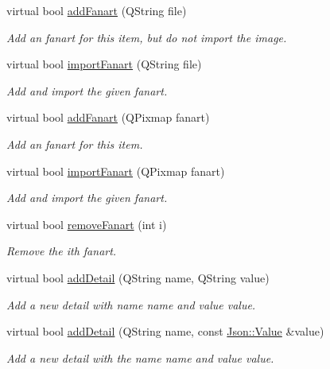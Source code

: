 \begin{DoxyCompactItemize}
virtual bool \hyperlink{class_a_w_e_1_1_media_item_a1a67e62362a38fcfafc0bb4178a9205a}{add\-Fanart} (Q\-String file)
\begin{DoxyCompactList}\small\item\em Add an fanart for this item, but do not import the image. \end{DoxyCompactList}\item 
virtual bool \hyperlink{class_a_w_e_1_1_media_item_a9156ae857b0ea582bce8166bccdee5f3}{import\-Fanart} (Q\-String file)
\begin{DoxyCompactList}\small\item\em Add and import the given fanart. \end{DoxyCompactList}\item 
virtual bool \hyperlink{class_a_w_e_1_1_media_item_af99834d4c4f625a5b8c6a7891f077c3b}{add\-Fanart} (Q\-Pixmap fanart)
\begin{DoxyCompactList}\small\item\em Add an fanart for this item. \end{DoxyCompactList}\item 
virtual bool \hyperlink{class_a_w_e_1_1_media_item_aa66bd862c10c5b003522855e1a5dad8c}{import\-Fanart} (Q\-Pixmap fanart)
\begin{DoxyCompactList}\small\item\em Add and import the given fanart. \end{DoxyCompactList}\item 
virtual bool \hyperlink{class_a_w_e_1_1_media_item_a3be42e522441f9b59d27383715381fb5}{remove\-Fanart} (int i)
\begin{DoxyCompactList}\small\item\em Remove the {\ttfamily i}th fanart. \end{DoxyCompactList}\item 
virtual bool \hyperlink{class_a_w_e_1_1_media_item_a64efa5df14b0d0342873fd497f2e764c}{add\-Detail} (Q\-String name, Q\-String value)
\begin{DoxyCompactList}\small\item\em Add a new detail with name {\ttfamily name} and value {\ttfamily value}. \end{DoxyCompactList}\item 
virtual bool \hyperlink{class_a_w_e_1_1_media_item_adbb367e4360cd5aedf23320db3efa499}{add\-Detail} (Q\-String name, const \hyperlink{class_json_1_1_value}{Json\-::\-Value} \&value)
\begin{DoxyCompactList}\small\item\em Add a new detail with the name {\ttfamily name} and value {\ttfamily value}. \end{DoxyCompactList}\item 

\end{DoxyCompactItemize}
